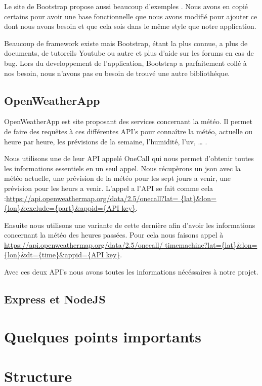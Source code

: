 \documentclass[a4paper, 12pt, french]{article}
\begin{document}
			Le site de Bootstrap propose aussi beaucoup d'exemples 
			\cite*{Bootstrap-Exemples}. Nous avons en copié certains
			pour avoir une base fonctionnelle que nous avons modifié pour
			ajouter ce dont nous avons besoin et que cela sois dans le même
			style que notre application.

			Beaucoup de framework existe mais Bootstrap, étant la plus connue, a plus de
			documents, de tutoreils Youtube ou autre et plus d'aide sur les forums en cas de
			bug. Lors du developpement de l'application, Bootstrap a parfaitement
			collé à nos besoin, nous n'avons pas eu besoin de trouvé une autre bibliothéque.

		\subsection{OpenWeatherApp}
			OpenWeatherApp est site proposant des services concernant la météo. Il permet
			de faire des requêtes à ces différentes API's pour connaître la météo, actuelle
			ou heure par heure, les prévisions de la semaine, l'humidité, l'uv, \ldots
			\cite*{OpenWeatherApp}.

			Nous utilisons une de leur API appelé OneCall \cite*{OpenWeatherApp-OneCall}
			qui nous permet d'obtenir toutes les informations essentiels en un seul appel.
			Nous récupèrons un json avec la météo actuelle, une prévision de la météo pour
			les sept jours a venir, une prévision pour les heurs a venir. L'appel a l'API se
			fait comme cela :\url{https://api.openweathermap.org/data/2.5/onecall?lat=
			{lat}&lon={lon}&exclude={part}&appid={API key}}.

			Ensuite nous utilisons une variante de cette dernière afin d'avoir les informations
			concernant la météo des heures passées. Pour cela nous faisons appel à 
			\url{https://api.openweathermap.org/data/2.5/onecall/
			timemachine?lat={lat}&lon={lon}&dt={time}&appid={API key}}.

			Avec ces deux API's nous avons toutes les informations nécéssaires à notre projet.

		\subsection{Express et NodeJS}

		\subsection{}

	\section{Quelques points importants}
	\section{Structure}

	\printbibliography
\end{document}
